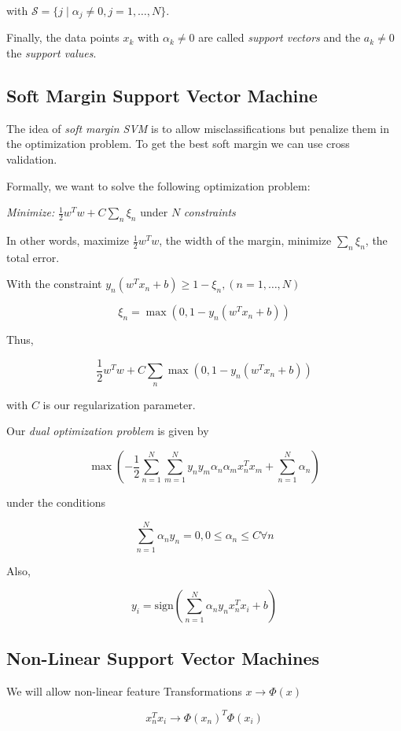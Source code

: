 with \(\mathcal{S} = \{j \mid \alpha_j \ne 0, j = 1, \dots, N\}\).

Finally, the data points \(x_k\) with \(\alpha_k \ne 0\) are called \emph{support vectors} 
and the \(a_k \ne 0 \) the \emph{support values}.

\subsection{Soft Margin Support Vector Machine}

The idea of \emph{soft margin SVM} is to allow misclassifications but penalize them in the optimization problem.
To get the best soft margin we can use cross validation.

Formally, we want to solve the following optimization problem: 

\emph{Minimize:} \(\frac{1}{2} w^T w + C \sum_n \xi_n\) under \(N\) \emph{constraints} 

In other words, maximize \(\frac{1}{2}w^Tw\), the width of the margin, minimize \(\sum_n \xi_n\), the total error.

With the constraint \(y_n (w^T x_n + b) \ge 1 - \xi_n, (n = 1, \dots, N)\)

\[
    \xi_n = \max (0, 1 - y_n (w^T x_n + b))
\]

Thus, 

\[
    \frac{1}{2} w^T w + C \sum_n \max (0, 1 - y_n (w^T x_n + b))
\]

with \(C\) is our regularization parameter.

Our \emph{dual optimization problem} is given by

\[
    \max \left(- \frac{1}{2} \sum_{n = 1}^{N}\sum_{m = 1}^{N} y_n y_m \alpha_n \alpha_m x_n^T x_m + \sum_{n = 1}^{N} \alpha_n \right)
\]

under the conditions

\[
    \sum_{n = 1}^{N} \alpha_n y_n = 0, 0 \le \alpha_n \le C \forall n
\]

Also, 

\[
    y_i = \text{sign} \left(\sum_{n = 1}^{N} \alpha_n y_n x_n^T x_i + b \right)
\]

\subsection{Non-Linear Support Vector Machines}

We will allow non-linear feature Transformations \(x \to \Phi(x)\) 

\[
    x_n^Tx_i \to \Phi(x_n)^T \Phi(x_i)
\]


